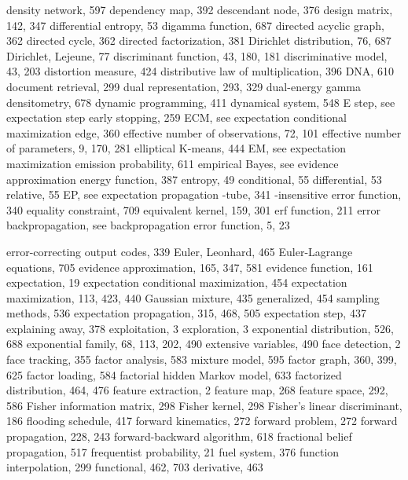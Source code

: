 \documentclass[
  10
]{article}
\begin{document}
density network, 597 dependency map, 392 descendant node, 376 design
matrix, 142, 347 differential entropy, 53 digamma function, 687 directed
acyclic graph, 362 directed cycle, 362 directed factorization, 381
Dirichlet distribution, 76, 687 Dirichlet, Lejeune, 77 discriminant
function, 43, 180, 181 discriminative model, 43, 203 distortion measure,
424 distributive law of multiplication, 396 DNA, 610 document retrieval,
299 dual representation, 293, 329 dual-energy gamma densitometry, 678
dynamic programming, 411 dynamical system, 548 E step, see expectation
step early stopping, 259 ECM, see expectation conditional maximization
edge, 360 effective number of observations, 72, 101 effective number of
parameters, 9, 170, 281 elliptical K-means, 444 EM, see expectation
maximization emission probability, 611 empirical Bayes, see evidence
approximation energy function, 387 entropy, 49 conditional, 55
differential, 53 relative, 55 EP, see expectation propagation -tube, 341
-insensitive error function, 340 equality constraint, 709 equivalent
kernel, 159, 301 erf function, 211 error backpropagation, see
backpropagation error function, 5, 23

error-correcting output codes, 339 Euler, Leonhard, 465 Euler-Lagrange
equations, 705 evidence approximation, 165, 347, 581 evidence function,
161 expectation, 19 expectation conditional maximization, 454
expectation maximization, 113, 423, 440 Gaussian mixture, 435
generalized, 454 sampling methods, 536 expectation propagation, 315,
468, 505 expectation step, 437 explaining away, 378 exploitation, 3
exploration, 3 exponential distribution, 526, 688 exponential family,
68, 113, 202, 490 extensive variables, 490 face detection, 2 face
tracking, 355 factor analysis, 583 mixture model, 595 factor graph, 360,
399, 625 factor loading, 584 factorial hidden Markov model, 633
factorized distribution, 464, 476 feature extraction, 2 feature map, 268
feature space, 292, 586 Fisher information matrix, 298 Fisher kernel,
298 Fisher's linear discriminant, 186 flooding schedule, 417 forward
kinematics, 272 forward problem, 272 forward propagation, 228, 243
forward-backward algorithm, 618 fractional belief propagation, 517
frequentist probability, 21 fuel system, 376 function interpolation, 299
functional, 462, 703 derivative, 463
\end{document}
